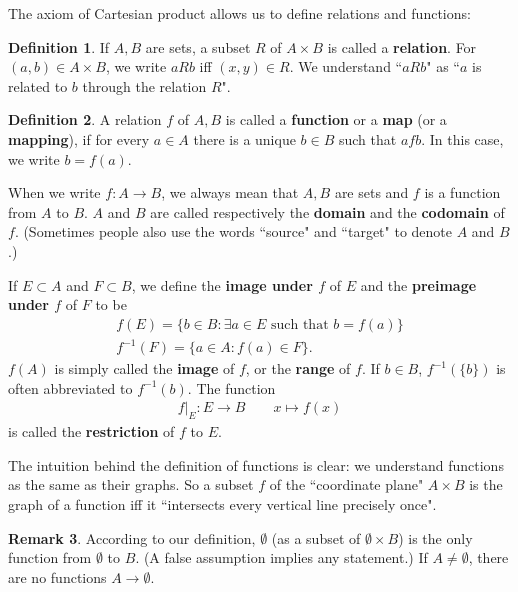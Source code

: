 \documentclass[12pt,b5paper,notitlepage]{article}
\theoremstyle{definition}
\newtheorem{df}{Definition}[section]
\newtheorem{rem}[df]{Remark}
\theoremstyle{plain}
\numberwithin{equation}{section}
\begin{document}
The axiom of Cartesian product allows us to define relations and functions:

\begin{df}
If $A,B$ are sets, a subset $R$ of $A\times B$ is called a \textbf{relation}. For $(a,b)\in A\times B$, we write $aRb$ iff $(x,y)\in R$. We understand ``$aRb$" as ``$a$ is related to $b$ through the relation $R$".
\end{df}


\begin{df}\label{lb39}
A relation $f$ of $A,B$  is called a \textbf{function} or a \textbf{map} (or a \textbf{mapping}), if for every $a\in A$ there is a unique $b\in B$ such that $afb$. In this case, we write $b=f(a)$. 

When we write $f:A\rightarrow B$, we always mean that $A,B$ are sets and $f$ is a function from $A$ to $B$. $A$ and $B$ are called respectively the \textbf{domain} and the \textbf{codomain} of $f$. (Sometimes people also use the words ``source" and ``target" to denote $A$ and $B$.) 

If $E\subset A$ and $F\subset B$, we define the \textbf{image under $f$} of $E$  and the \textbf{preimage under $f$} of $F$ to be
\begin{gather*}
f(E)=\{b\in B:\exists a\in E\text{ such that }b=f(a)\}\\
f^{-1}(F)=\{a\in A: f(a)\in F\}.
\end{gather*}
$f(A)$ is simply called the \textbf{image} of $f$, or the \textbf{range} of $f$. If $b\in B$, $f^{-1}(\{b\})$ is often abbreviated to $f^{-1}(b)$. The function 
\begin{align*}
f|_E:E\rightarrow B\qquad x\mapsto f(x)
\end{align*}
is called the \textbf{restriction}  of $f$ to $E$. \hfill\qedsymbol
\end{df}


The intuition behind the definition of functions is clear: we understand functions as the same as their graphs. So a subset $f$ of the ``coordinate plane" $A\times B$ is the graph of a function iff it ``intersects every vertical line precisely once".


\begin{rem}\label{lb40}
According to our definition, $\emptyset$ (as a subset of $\emptyset\times B$) is the only function from $\emptyset$ to $B$. (A false assumption implies any statement.) If $A\neq\emptyset$, there are no functions $A\rightarrow\emptyset$.
\end{rem}
\end{document}
